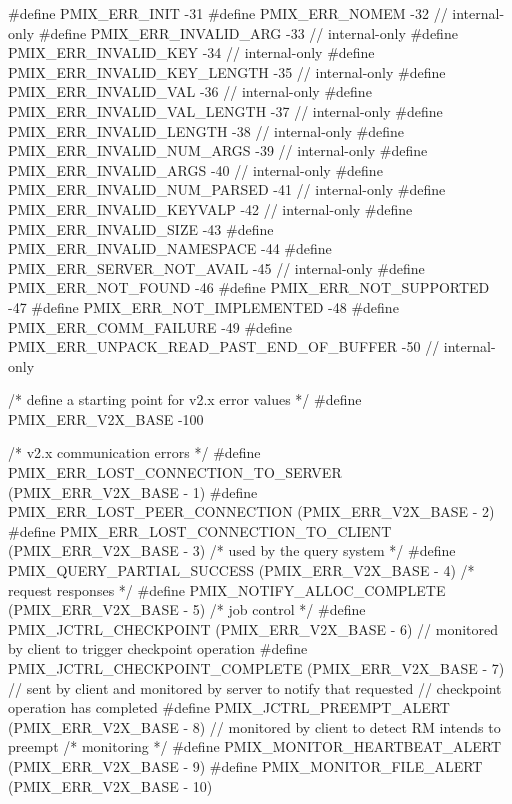 \begin{codepar}
#define PMIX_ERR_INIT                               -31
#define PMIX_ERR_NOMEM                              -32         // internal-only
#define PMIX_ERR_INVALID_ARG                        -33         // internal-only
#define PMIX_ERR_INVALID_KEY                        -34         // internal-only
#define PMIX_ERR_INVALID_KEY_LENGTH                 -35         // internal-only
#define PMIX_ERR_INVALID_VAL                        -36         // internal-only
#define PMIX_ERR_INVALID_VAL_LENGTH                 -37         // internal-only
#define PMIX_ERR_INVALID_LENGTH                     -38         // internal-only
#define PMIX_ERR_INVALID_NUM_ARGS                   -39         // internal-only
#define PMIX_ERR_INVALID_ARGS                       -40         // internal-only
#define PMIX_ERR_INVALID_NUM_PARSED                 -41         // internal-only
#define PMIX_ERR_INVALID_KEYVALP                    -42         // internal-only
#define PMIX_ERR_INVALID_SIZE                       -43
#define PMIX_ERR_INVALID_NAMESPACE                  -44
#define PMIX_ERR_SERVER_NOT_AVAIL                   -45         // internal-only
#define PMIX_ERR_NOT_FOUND                          -46
#define PMIX_ERR_NOT_SUPPORTED                      -47
#define PMIX_ERR_NOT_IMPLEMENTED                    -48
#define PMIX_ERR_COMM_FAILURE                       -49
#define PMIX_ERR_UNPACK_READ_PAST_END_OF_BUFFER     -50         // internal-only

/* define a starting point for v2.x error values */
#define PMIX_ERR_V2X_BASE                   -100

/* v2.x communication errors */
#define PMIX_ERR_LOST_CONNECTION_TO_SERVER      (PMIX_ERR_V2X_BASE -  1)
#define PMIX_ERR_LOST_PEER_CONNECTION           (PMIX_ERR_V2X_BASE -  2)
#define PMIX_ERR_LOST_CONNECTION_TO_CLIENT      (PMIX_ERR_V2X_BASE -  3)
/* used by the query system */
#define PMIX_QUERY_PARTIAL_SUCCESS              (PMIX_ERR_V2X_BASE -  4)
/* request responses */
#define PMIX_NOTIFY_ALLOC_COMPLETE              (PMIX_ERR_V2X_BASE -  5)
/* job control */
#define PMIX_JCTRL_CHECKPOINT                   (PMIX_ERR_V2X_BASE -  6)    // monitored by client to trigger checkpoint operation
#define PMIX_JCTRL_CHECKPOINT_COMPLETE          (PMIX_ERR_V2X_BASE -  7)    // sent by client and monitored by server to notify that requested
                                                                            //     checkpoint operation has completed
#define PMIX_JCTRL_PREEMPT_ALERT                (PMIX_ERR_V2X_BASE -  8)    // monitored by client to detect RM intends to preempt
/* monitoring */
#define PMIX_MONITOR_HEARTBEAT_ALERT            (PMIX_ERR_V2X_BASE -  9)
#define PMIX_MONITOR_FILE_ALERT                 (PMIX_ERR_V2X_BASE - 10)


\end{codepar}
